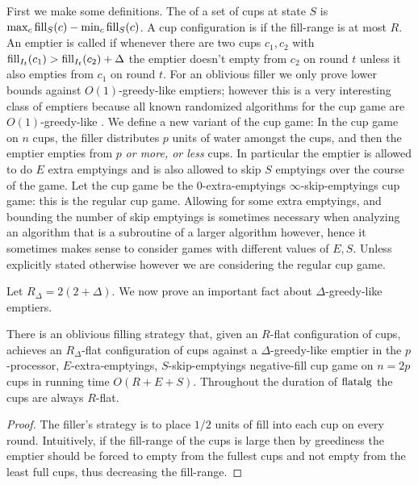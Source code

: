 First we make some definitions. The  of a set of
cups at state $S$ is $\max_c \operatorname{\text{\textup{fill}}}_S(c) - \min_c \operatorname{\text{\textup{fill}}}_S(c)$. A cup
configuration is  if the fill-range is at most
$R$. An emptier is called  if whenever
there are two cups $c_1, c_2$ with $\operatorname{\text{\textup{fill}}}_{I_t}(c_1) >
\operatorname{\text{\textup{fill}}}_{I_t}(c_2) + \Delta$ the emptier doesn't empty from $c_2$ on
round $t$ unless it also empties from $c_1$ on round $t$. For an
oblivious filler we only prove lower bounds against
$O(1)$-greedy-like emptiers; however this is a very interesting
class of emptiers because all known randomized algorithms for the
cup game are $O(1)$-greedy-like \cite{BenderFaKu19, Kuszmaul20}. We define a
new variant of the cup game: In the 
 cup game on $n$ cups, the filler
distributes $p$ units of water amongst the cups, and then the
emptier empties from $p$ \textit{or more, or less} cups. In
particular the emptier is allowed to do $E$ extra emptyings and
is also allowed to skip $S$ emptyings over the course of the
game. Let the  cup game be the $0$-extra-emptyings
$\infty$-skip-emptyings cup game: this is the regular cup game.
Allowing for some extra emptyings, and bounding the number of
skip emptyings is sometimes necessary when analyzing an algorithm
that is a subroutine of a larger algorithm however, hence it
sometimes makes sense to consider games with different values of
$E,S$. Unless explicitly stated otherwise however we are
considering the regular cup game.

Let $R_\Delta = 2(2+\Delta)$.
We now prove an important fact about $\Delta$-greedy-like emptiers.
\begin{lemma}
  \label{lem:TO_flatalg}
  There is an oblivious filling strategy  that,
  given an $R$-flat configuration of cups, achieves an
  $R_\Delta$-flat configuration of cups against a
  $\Delta$-greedy-like emptier in the $p$-processor,
  $E$-extra-emptyings, $S$-skip-emptyings negative-fill cup game
  on $n=2p$ cups in running time $O(R+E+S)$. Throughout the
  duration of $\operatorname{\text{\textup{flatalg}}}$ the cups are always $R$-flat.
\end{lemma}
\begin{proof}
  The filler's strategy is to place $1/2$ units of fill into each
  cup on every round.
  Intuitively, if the fill-range of the cups is large then by
  greediness the emptier should be forced to empty from the
  fullest cups and not empty from the least full cups, thus
  decreasing the fill-range.
\end{proof}

